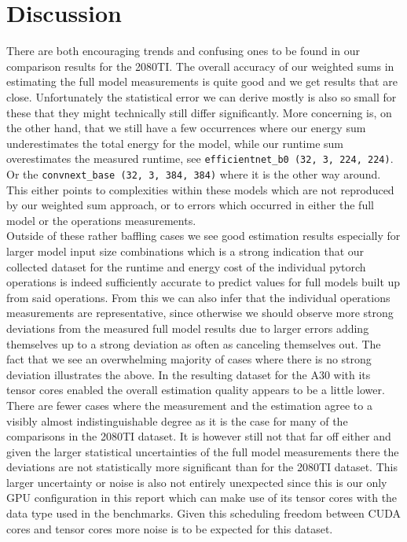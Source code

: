 \documentclass[conference]{IEEEtran}
\begin{document}

\section{Discussion}
There are both encouraging trends and confusing ones to be found in our comparison results for the 2080TI. The overall accuracy of our weighted sums in estimating the full model measurements is quite good and we get results that are close. Unfortunately the statistical error we can derive mostly is also so small for these that they might technically still differ significantly. More concerning is, on the other hand, that we still have a few occurrences where our energy sum underestimates the total energy for the model, while our runtime sum overestimates the measured runtime, see \texttt{efficientnet\_b0 (32, 3, 224, 224)}. Or the \texttt{convnext\_base (32, 3, 384, 384)} where it is the other way around. 
This either points to complexities within these models which are not reproduced by our weighted sum approach, or to errors which occurred in either the full model or the operations measurements.\\
Outside of these rather baffling cases we see good estimation results especially for larger model input size combinations which is a strong indication that our collected dataset for the runtime and energy cost of the individual pytorch operations is indeed sufficiently accurate to predict values for full models built up from said operations. From this we can also infer that the individual operations measurements are representative, since otherwise we should observe more strong deviations from the measured full model results due to larger errors adding themselves up to a strong deviation as often as canceling themselves out. The fact that we see an overwhelming majority of cases where there is no strong deviation illustrates the above.
In the resulting dataset for the A30 with its tensor cores enabled the overall estimation quality appears to be a little lower. There are fewer cases where the measurement and the estimation agree to a visibly almost indistinguishable degree as it is the case for many of the comparisons in the 2080TI dataset. It is however still not that far off either and given the larger statistical uncertainties of the full model measurements there the deviations are not statistically more significant than for the 2080TI dataset. This larger uncertainty or noise is also not entirely unexpected since this is our only GPU configuration in this report which can make use of its tensor cores with the data type used in the benchmarks. Given this scheduling freedom between CUDA cores and tensor cores more noise is to be expected for this dataset. \\
\end{document}
